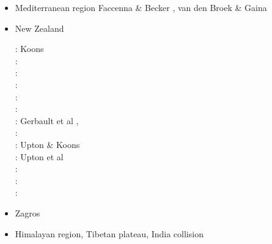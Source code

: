 \begin{itemize}
\item Mediterranean region 
{\scriptsize
\cite{pimo97}\cite{nesg97}
\cite{nesb99}
\cite{wosp00}
\cite{pimo03}
\cite{spwo04}
\cite{wogs09}
\cite{bofb10}\cite{fabe10}
\cite{chsv14}\cite{chsg14}\cite{vavs14}\cite{mafv14}
\cite{mesj16}
\cite{spcv18}
\cite{blgf20}
Faccenna \& Becker \cite{fabe20}, van den Broek \& Gaina \cite{vaga20}
}
\item {New Zealand} 
\begin{scriptsize}
\nineteenninety: Koons \cite{koon90}\\
\nineteenninetyfive: \cite{brbe95}\\
\nineteenninetysix: \cite{bekh96}\\
\nineteenninetyeight: \cite{wabb98}\\
\nineteenninetynine: \cite{babr99}\\
\twothousandtwo: \cite{gedh02}\cite{pybf02}\\
\twothousandthree: Gerbault et al \cite{gehd03}, \cite{konc03}\cite{upke03}\\
\twothousandsix: \cite{libi06}\\
\twothousandseven: Upton \& Koons \cite{upko07}\\
\twothousandnine: Upton et al \cite{upkc09}\\
\twothousandten: \cite{pyeg10}\cite{spgs10a}\\
\twothousandtwelve: \cite{grel12}\\
\twothousandthirteen: \cite{sths13}
\end{scriptsize}

\item {Zagros} 
{\scriptsize
\cite{vech06}
\cite{hamo10}
\cite{yakm11}
\cite{nipc13}
\cite{frba14}
\cite{ghbu14}
\cite{coyc16}
\cite{rugb17}
}
\item {Himalayan region, Tibetan plateau, India collision} 


\end{itemize}
